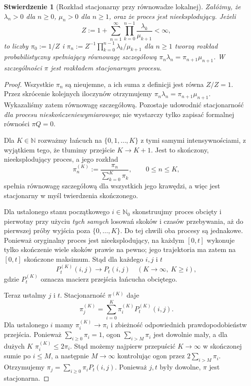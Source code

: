 \documentclass[11pt,a4paper,oneside]{report}
\numberwithin{equation}{chapter}
\theoremstyle{plain}
\newtheorem{stwierdzenie}[twierdzenie]{Stwierdzenie}
\theoremstyle{definition}
\theoremstyle{remark}
\newcommand{\N}{\mathbb{N}}
\begin{document}
\begin{stwierdzenie}[Rozkład stacjonarny przy równowadze lokalnej]
Załóżmy, że $\lambda_n>0$ dla $n\ge0$,
$\mu_n>0$ dla $n\ge1$, oraz że proces jest nieeksplodujący.
Jeżeli
\[
Z:=1+\sum_{n=1}^\infty
\prod_{k=0}^{n-1}\frac{\lambda_k}{\mu_{k+1}}<\infty,
\]
to liczby
$\pi_0:=1/Z$ i
$\pi_n:=Z^{-1}\prod_{k=0}^{n-1}\lambda_k/\mu_{k+1}$
dla $n\ge1$ tworzą rozkład probabilistyczny spełniający
równowagę szczegółową
$\pi_n\lambda_n=\pi_{n+1}\mu_{n+1}$.
W szczególności $\pi$ jest rozkładem stacjonarnym procesu.
\end{stwierdzenie}
\begin{proof}
Wszystkie $\pi_n$ są nieujemne, a ich suma z definicji
jest równa $Z/Z=1$. Przez skrócenie kolejnych iloczynów
otrzymujemy $\pi_n\lambda_n=\pi_{n+1}\mu_{n+1}$.
Wykazaliśmy zatem równowagę szczegółową.
Pozostaje udowodnić stacjonarność \emph{dla procesu
nieskończeniewymiarowego}; nie wystarczy tylko zapisać
formalnej równości $\pi Q=0$.

Dla $K\in\N$ rozważmy łańcuch na $\{0,1,\ldots,K\}$
z tymi samymi intensywnościami, z wyjątkiem tego,
że tłumimy przejście $K\to K+1$.
Jest to skończony, nieeksplodujący proces,
a jego rozkład
\[
\pi_n^{(K)}:=\frac{\pi_n}{\sum_{k=0}^K\pi_k},
\qquad 0\le n\le K,
\]
spełnia równowagę szczegółową dla wszystkich jego krawędzi,
a więc jest stacjonarny w myśl twierdzenia skończonego.

Dla ustalonego stanu początkowego $i\in\N_0$ skonstruujmy
proces obcięty i pierwotny przy użyciu \emph{tych samych}
losowań skoków i czasów przebywania, aż do pierwszej próby
wyjścia poza $\{0,\ldots,K\}$. Do tej chwili oba procesy
są jednakowe. Ponieważ oryginalny proces jest nieeksplodujący,
na każdym $[0,t]$ wykonuje tylko skończenie wiele skoków
prawie na pewno; jego trajektoria ma zatem na $[0,t]$
skończone maksimum. Stąd dla każdego $i,j$ i $t$
\[
P_t^{(K)}(i,j)\longrightarrow P_t(i,j)
\quad (K\to\infty,\ K\ge i),
\]
gdzie $P_t^{(K)}$ oznacza macierz przejścia łańcucha
obciętego.

Teraz ustalmy $j$ i $t$. Stacjonarność $\pi^{(K)}$ daje
\[
\pi_j^{(K)}=\sum_{i=0}^K\pi_i^{(K)}P_t^{(K)}(i,j).
\]
Dla ustalonego $i$ mamy $\pi_i^{(K)}\to\pi_i$
i zbieżność odpowiednich prawdopodobieństw przejścia.
Ponieważ $\sum_{i\ge0}\pi_i=1$, ogon
$\sum_{i>M}\pi_i$ jest dowolnie mały, a dla dużych $K$
$\pi_i^{(K)}\le2\pi_i$. Stąd możemy najpierw przepuścić
$K\to\infty$ w skończonej sumie po $i\le M$,
a następnie $M\to\infty$ kontrolując ogon przez
$2\sum_{i>M}\pi_i$. Otrzymujemy
$\pi_j=\sum_{i\ge0}\pi_iP_t(i,j)$.
Ponieważ $j,t$ były dowolne, $\pi$ jest stacjonarna.
\end{proof}
\end{document}
